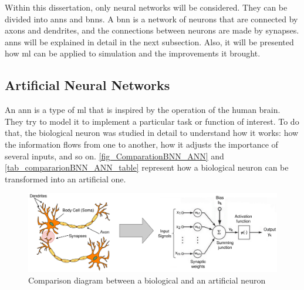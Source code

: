 Within this dissertation, only neural networks will be considered. They can be divided into \glspl{ann} and \glspl{bnn}. 
A \gls{bnn} is a network of neurons that are connected by axons and dendrites, and the connections between neurons are made by synapses. 
\glspl{ann} will be explained in detail in the next subsection. Also, it will be presented how \gls{ml} can be applied to simulation and the 
improvements it brought. 

\subsection{Artificial Neural Networks}

An \gls{ann} is a type of \gls{ml} that is inspired by the operation of the human brain. They try to model it to implement a particular task or 
function of interest. To do that, the biological neuron was studied in detail to understand how it works: how the information flows from one 
to another, how it adjusts the importance of several inputs, and so on. \autoref{fig_ComparationBNN_ANN} and 
\autoref{tab_compararionBNN_ANN_table} represent how a biological neuron can be transformed into an artificial one.

\begin{figure}[H]
	\centering
 	\includegraphics[width=0.9\linewidth]{Images/ComparationBNN_ANN.png}
 	\caption{Comparison diagram between a biological and an artificial neuron}
	 \label{fig_ComparationBNN_ANN}
\end{figure}

